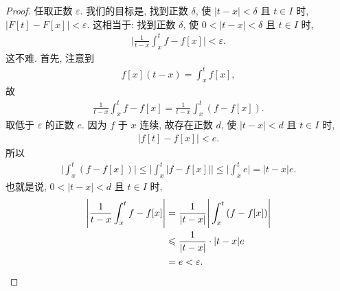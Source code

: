 \begin{proof}
    任取正数 $\varepsilon$. 我们的目标是, 找到正数 $\delta$, 使 $|t - x| < \delta$ 且 $t \in I$ 时, $|F[t] - F[x]| < \varepsilon$. 这相当于: 找到正数 $\delta$, 使 $0 < |t - x| < \delta$ 且 $t \in I$ 时,
    \begin{align*}
        \Bigg| \frac{1}{t - x} \int_{x}^{t} {f} - f[x] \Bigg| < \varepsilon.
    \end{align*}
    这不难. 首先, 注意到
    \begin{align*}
        f[x](t - x) = \int_{x}^{t} {f[x]},
    \end{align*}
    故
    \begin{align*}
        \frac{1}{t - x} \int_{x}^{t} {f} - f[x] = \frac{1}{t - x} \int_{x}^{t} {(f - f[x])}.
    \end{align*}
    取低于 $\varepsilon$ 的正数 $e$. 因为 $f$ 于 $x$ 连续, 故存在正数 $d$, 使 $|t - x| < d$ 且 $t \in I$ 时,
    \begin{align*}
        |f[t] - f[x]| < e.
    \end{align*}
    所以
    \begin{align*}
        \Bigg| \int_{x}^{t} {(f - f[x])} \Bigg| \leq \Bigg| \int_{x}^{t} {|f - f[x]|} \Bigg| \leq \Bigg| \int_{x}^{t} {e} \Bigg| = |t - x|e.
    \end{align*}
    也就是说, $0 < |t - x| < d$ 且 $t \in I$ 时,
    \begin{align*}
        {\Bigg| \frac{1}{t - x} \int_{x}^{t} {f} - f[x] \Bigg|}
        = {}    & \frac{1}{|t - x|} \Bigg| \int_{x}^{t} {(f - f[x])} \Bigg| \\
        \leq {} & \frac{1}{|t - x|} \cdot |t - x|e                          \\
        = {}    & e < \varepsilon. \qedhere
    \end{align*}
\end{proof}
